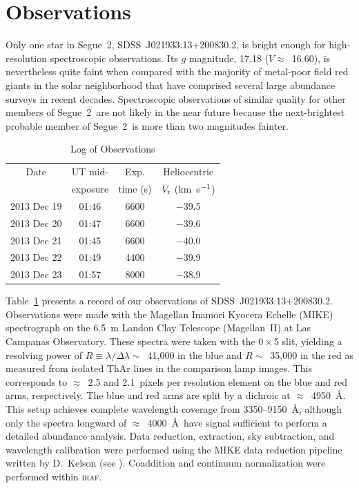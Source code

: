 \documentclass[useAMS,usenatbib,usegraphicx]{mn2e}
\def\kmsec{\mbox{km~s$^{\rm -1}$}}
\def\seg{\mbox{SDSS~J021933.13$+$200830.2}}
\def\seggal{\mbox{Segue~2}}
\begin{document}
\section{Observations}
\label{observations}


Only one star in \seggal, \seg, is bright enough for 
high-resolution spectroscopic observations.
Its $g$ magnitude, 17.18 
($V \approx$~16.60),
is nevertheless quite faint 
when compared with
the majority of metal-poor 
field red giants in the solar neighborhood
that have comprised several large abundance surveys 
in recent decades.
Spectroscopic observations of similar quality
for other members of \seggal\
are not likely in the near future
because the next-brightest probable member of \seggal\ is more than 
two magnitudes fainter.


\begin{table}
\begin{minipage}{\textwidth}
\caption{Log of Observations
\label{obstab}}
\begin{tabular}{cccc}
\hline
Date &
UT mid- &
Exp. & 
Heliocentric \\
 &
exposure &
time (s) &
$V_{\rm r}$ (\kmsec) \\
\hline
2013 Dec 19 & 01:46 & 6600 & $-$39.5 \\
2013 Dec 20 & 01:47 & 6600 & $-$39.6 \\
2013 Dec 21 & 01:45 & 6600 & $-$40.0 \\
2013 Dec 22 & 01:49 & 4400 & $-$39.9 \\
2013 Dec 23 & 01:57 & 8000 & $-$38.9 \\
\hline
\end{tabular}
\end{minipage}
\end{table}


Table~\ref{obstab} presents a record of our observations of \seg.
Observations were made with the Magellan Inamori Kyocera Echelle (MIKE)
spectrograph \citep{bernstein03}
on the 
6.5~m Landon Clay Telescope (Magellan~II)
at Las Campanas Observatory.
These spectra were taken with the 0\,$\times$\,5 slit, 
yielding
a resolving power of $R \equiv \lambda/\Delta\lambda \sim$~41,000 in the blue 
and $R \sim$~35,000 in the red as measured from isolated ThAr lines
in the comparison lamp images.
This corresponds to $\approx$~2.5 and 2.1~pixels per resolution element
on the blue and red arms, respectively.
The blue and red arms are split by a dichroic at $\approx$~4950~\AA.
This setup achieves complete wavelength coverage from 
3350--9150~\AA, although
only the spectra longward of $\approx$~4000~\AA\ 
have signal sufficient to perform a detailed abundance analysis.
Data reduction,
extraction, sky subtraction,
and wavelength calibration were performed using 
the MIKE data reduction pipeline
written by D.\ Kelson
(see \citealt{kelson03}).
Coaddition and continuum normalization 
were performed within
\textsc{iraf}\@.
\end{document}
